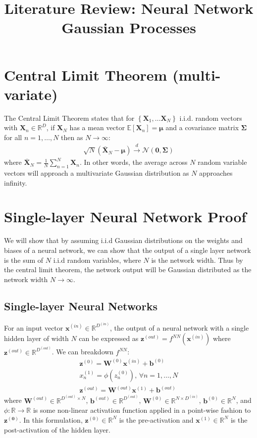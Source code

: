 \documentclass[twoside,11pt]{article}
\begin{document}
\title{Literature Review: Neural Network Gaussian Processes}
\maketitle
\section{Central Limit Theorem (multi-variate)}
The Central Limit Theorem states that for $\left\{ \mathbf{X}_1, \dots \mathbf{X}_N \right\}$ i.i.d. random vectors with $\mathbf{X}_n \in \mathbb{R}^D$, if $\mathbf{X}_N$ has a mean vector $\mathbb{E}\left[\mathbf{X}_n\right] = \boldsymbol{\mu}$ and a covariance matrix $\boldsymbol{\Sigma}$ for all $n=1, \dots, N$ then as $N \rightarrow \infty$:
\begin{align}
    \sqrt{N}\left(\bar{\mathbf{X}}_N-\boldsymbol{\mu}\right) \xrightarrow{d} \mathcal{N}\left(\mathbf{0}, \boldsymbol{\Sigma}\right)
\end{align}
where $\bar{\mathbf{X}}_N = \frac{1}{N}\sum_{n=1}^N \mathbf{X}_n$. In other words, the average across $N$ random variable vectors will approach a multivariate Gaussian distribution as $N$ approaches infinity.
\section{Single-layer Neural Network Proof \cite{lee2018deep}}
We will show that by assuming i.i.d Gaussian distributions on the weights and biases of a neural network, we can show that the output of a single layer network is the sum of $N$ i.i.d random variables, where $N$ is the network width. Thus by the central limit theorem, the network output will be Gaussian distributed as the network width $N \rightarrow \infty$.
\subsection{Single-layer Neural Networks}
For an input vector $\mathbf{x}^{(in)} \in \mathbb{R}^{D^{(in)}}$, the output of a neural network with a single hidden layer of width $N$ can be expressed as $\mathbf{z}^{(out)} = f^{NN}\left(\mathbf{x}^{(in)}\right)$ where $\mathbf{z}^{(out)} \in \mathbb{R}^{D^{(out)}}$. We can breakdown $f^{NN}$:
\begin{align}
    \label{single-layer-hidden}
    \mathbf{z}^{(0)} = \mathbf{W}^{(0)} \mathbf{x}^{(in)} + \mathbf{b}^{(0)}\\
    \label{single-layer-hidden-non-linearity}
    x_n^{(1)} = \phi(z_n^{(0)})\text{, } \forall n = 1, \dots, N\\
    \label{single-layer-output}
    \mathbf{z}^{(out)} = \mathbf{W}^{(out)} \mathbf{x}^{(1)} + \mathbf{b}^{(out)}
\end{align}
where $\mathbf{W}^{(out)} \in \mathbb{R}^{D^{(out)} \times N}$, $\mathbf{b}^{(out)} \in \mathbb{R}^{D^{(out)}}$,  $\mathbf{W}^{(0)} \in \mathbb{R}^{N \times D^{(in)}}$, $\mathbf{b}^{(0)} \in \mathbb{R}^{N}$, and $\phi: \mathbb{R} \rightarrow \mathbb{R}$ is some non-linear activation function applied in a point-wise fashion to $\mathbf{z^{(0)}}$. In this formulation, $\mathbf{z}^{(0)} \in \mathbb{R}^N$ is the pre-activation and $\mathbf{x}^{(1)}  \in \mathbb{R}^N$ is the post-activation of the hidden layer.
\end{document}
